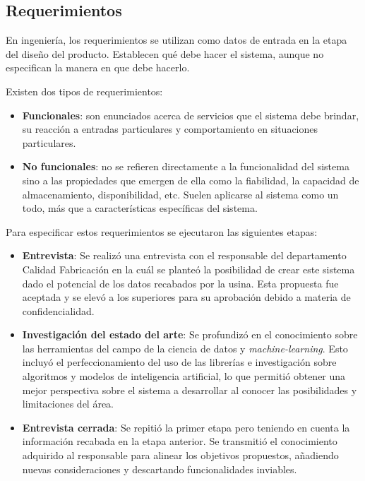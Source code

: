 \documentclass[a4paper,12pt]{article}
\begin{document}
\subsection{Requerimientos}
En ingeniería, los requerimientos se utilizan como datos de entrada en la etapa del diseño del producto. Establecen qué debe hacer el sistema, aunque no especifican la manera en que debe hacerlo.

Existen dos tipos de requerimientos:
\begin{itemize}[noitemsep, topsep=2pt]
	\item \textbf{Funcionales}: son enunciados acerca de servicios que el sistema debe brindar, su reacción a entradas particulares y comportamiento en situaciones particulares.
	\item \textbf{No funcionales}: no se refieren directamente a la funcionalidad del sistema sino a las propiedades que emergen de ella como la fiabilidad, la capacidad de almacenamiento, disponibilidad, etc. Suelen aplicarse al sistema como un todo, más que a características específicas del sistema.
\end{itemize}

Para especificar estos requerimientos se ejecutaron las siguientes etapas:
\begin{itemize}
	\item \textbf{Entrevista}:  Se realizó una entrevista con el responsable del departamento Calidad Fabricación en la cuál se planteó la posibilidad de crear este sistema dado el potencial de los datos recabados por la usina. Esta propuesta fue aceptada y se elevó a los superiores para su aprobación debido a materia de confidencialidad.
	\item \textbf{Investigación del estado del arte}: Se profundizó en el conocimiento sobre las herramientas del campo de la ciencia de datos y \textit{machine-learning}. Esto incluyó el perfeccionamiento del uso de las librerías e investigación sobre algoritmos y modelos de inteligencia artificial, lo que permitió obtener una mejor perspectiva sobre el sistema a desarrollar al conocer las posibilidades y limitaciones del área.
	\item \textbf{Entrevista cerrada}: Se repitió la primer etapa pero teniendo en cuenta la información recabada en la etapa anterior. Se transmitió el conocimiento adquirido al responsable para alinear los objetivos propuestos, añadiendo nuevas consideraciones y descartando funcionalidades inviables.
\end{itemize}
\end{document}

